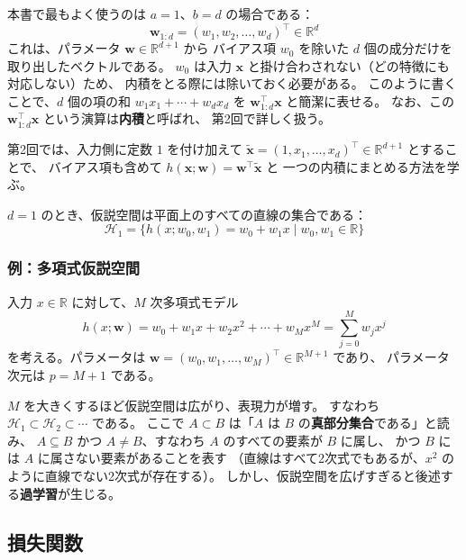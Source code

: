 本書で最もよく使うのは $a = 1$、$b = d$ の場合である：
\begin{equation}
  \bm{w}_{1:d} = (w_1, w_2, \ldots, w_d)^\top \in \mathbb{R}^d
\end{equation}
これは、パラメータ $\bm{w} \in \mathbb{R}^{d+1}$ から
バイアス項 $w_0$ を除いた $d$ 個の成分だけを取り出したベクトルである。
$w_0$ は入力 $\bm{x}$ と掛け合わされない（どの特徴にも対応しない）ため、
内積をとる際には除いておく必要がある。
このように書くことで、$d$ 個の項の和
$w_1 x_1 + \cdots + w_d x_d$ を $\bm{w}_{1:d}^\top \bm{x}$ と簡潔に表せる。
なお、この $\bm{w}_{1:d}^\top \bm{x}$ という演算は\textbf{内積}と呼ばれ、
第2回で詳しく扱う。

第2回では、入力側に定数 $1$ を付け加えて
$\tilde{\bm{x}} = (1, x_1, \ldots, x_d)^\top \in \mathbb{R}^{d+1}$ とすることで、
バイアス項も含めて $h(\bm{x}; \bm{w}) = \bm{w}^\top \tilde{\bm{x}}$ と
一つの内積にまとめる方法を学ぶ。

$d = 1$ のとき、仮説空間は平面上のすべての直線の集合である：
\begin{equation}
  \mathcal{H}_1 = \{ h(x; w_0, w_1) = w_0 + w_1 x \mid w_0, w_1 \in \mathbb{R} \}
\end{equation}

\subsubsection{例：多項式仮説空間}

入力 $x \in \mathbb{R}$ に対して、$M$ 次多項式モデル
\begin{equation}
  h(x; \bm{w}) = w_0 + w_1 x + w_2 x^2 + \cdots + w_M x^M
  = \sum_{j=0}^{M} w_j x^j
\end{equation}
を考える。パラメータは $\bm{w} = (w_0, w_1, \ldots, w_M)^\top \in \mathbb{R}^{M+1}$ であり、
パラメータ次元は $p = M + 1$ である。

$M$ を大きくするほど仮説空間は広がり、表現力が増す。
すなわち $\mathcal{H}_1 \subset \mathcal{H}_2 \subset \cdots$ である。
ここで $A \subset B$ は「$A$ は $B$ の\textbf{真部分集合}である」と読み、
$A \subseteq B$ かつ $A \neq B$、すなわち $A$ のすべての要素が $B$ に属し、
かつ $B$ には $A$ に属さない要素があることを表す
（直線はすべて2次式でもあるが、$x^2$ のように直線でない2次式が存在する）。
しかし、仮説空間を広げすぎると後述する\textbf{過学習}が生じる。


\subsection{損失関数}

